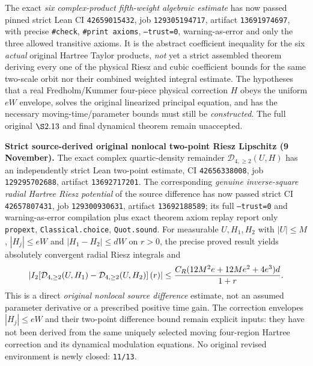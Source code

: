\documentclass[11pt]{amsart}
\begin{document}
The exact \emph{six complex-product fifth-weight algebraic estimate}
has now passed pinned strict Lean CI \texttt{42659015432},
job \texttt{129305194717}, artifact \texttt{13691974697},
with precise \texttt{\#check}, \texttt{\#print axioms},
\texttt{--trust=0}, warning-as-error and only the three allowed
transitive axioms.  It is the abstract coefficient inequality for
the six \emph{actual} original Hartree Taylor products, \emph{not}
yet a strict assembled theorem deriving every one of the physical
Riesz and cubic coefficient bounds for the same two-scale orbit
nor their combined weighted integral estimate.
The hypotheses that a real Fredholm/Kummer four-piece physical
correction $H$ obeys the uniform $eW$ envelope, solves the
original linearized principal equation, and has the necessary
moving-time/parameter bounds must still be \emph{constructed}.
The full original $\S2.13$ and final dynamical theorem remain
unaccepted.


\medskip
\noindent\textbf{Strict source-derived original nonlocal two-point Riesz Lipschitz (9 November).}
The exact complex quartic-density remainder
$\mathcal D_{4,\ge2}(U,H)$ has an independently strict Lean
two-point estimate, CI \texttt{42656338008}, job
\texttt{129295702688}, artifact \texttt{13692717201}.
The corresponding \emph{genuine inverse-square radial Hartree
Riesz potential} of the source difference has now passed strict
CI \texttt{42657807431}, job \texttt{129300930631},
artifact \texttt{13692188589}; its full \texttt{--trust=0}
and warning-as-error compilation plus exact theorem axiom replay
report only \texttt{propext}, \texttt{Classical.choice},
\texttt{Quot.sound}.  For measurable $U,H_1,H_2$ with
$|U|\le M$, $|H_j|\le eW$ and $|H_1-H_2|\le dW$ on $r>0$,
the precise proved result yields absolutely convergent radial
Riesz integrals and
\[
 \left|I_2\!\left[
  \mathcal D_{4,\ge2}(U,H_1)
  -\mathcal D_{4,\ge2}(U,H_2)\right](r)\right|
 \le {C_R(12M^2e+12Me^2+4e^3)d\over1+r}.
\]
This is a direct \emph{original nonlocal source difference}
estimate, not an assumed parameter derivative or a prescribed
positive time gain. The correction envelopes $|H_j|\le eW$
and their two-point difference bound remain explicit inputs:
they have not been derived from the same uniquely selected
moving four-region Hartree correction and its dynamical
modulation equations.  No original revised environment is
newly closed: \texttt{11/13}.
\end{document}
